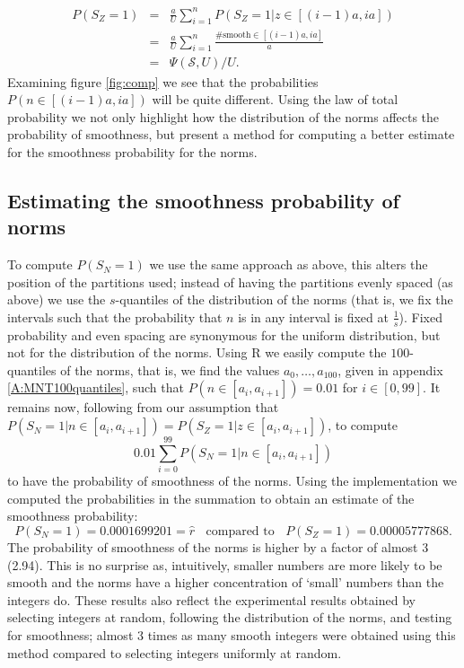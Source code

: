 \documentclass[a4paper, 12pt, envcountsect, runningheads]{llncs}
\numberwithin{figure}{section}
\numberwithin{equation}{section}
\begin{document}
\begin{eqnarray*}
P(S_Z=1)&=&\frac{a}{U}\sum_{i=1}^{n}P(S_Z=1| z\in[(i-1)a,ia])\\
&=&\frac{a}{U}\sum_{i=1}^{n}\frac{\#\mbox{smooth}\in[(i-1)a,ia]}{a}\\
&=&\Psi(\mathcal{S},U)/U.
\end{eqnarray*}
Examining figure \ref{fig:comp} we see that the probabilities $P(n\in[(i-1)a,ia])$ will be quite different. Using the law of total probability we not only highlight how the distribution of the norms affects the probability of smoothness, but present a method for computing a better estimate for the smoothness probability for the norms. 

\subsection{Estimating the smoothness probability of norms}
\label{ss:smoothness}
To compute $P(S_N=1)$ we use the same approach as above, this alters the position of the partitions used; instead of having the partitions evenly spaced (as above) we use the $s$-quantiles of the distribution of the norms (that is, we fix the intervals such that the probability that $n$ is in any interval is fixed at $\frac{1}{s}$). Fixed probability and even spacing are synonymous for the uniform distribution, but not for the distribution of the norms. Using R we easily compute the $100$-quantiles of the norms, that is, we find the values $a_0,\ldots,a_{100}$, given in appendix \ref{A:MNT100quantiles}, such that $P(n\in[a_i,a_{i+1}])=0.01$ for $i\in[0,99]$. It remains now, following from our assumption that $P(S_N=1| n\in[a_i,a_{i+1}])=P(S_Z=1| z\in[a_i,a_{i+1}])$, to compute $$0.01\sum_{i=0}^{99}P(S_N=1| n\in[a_i,a_{i+1}])$$ to have the probability of smoothness of the norms. Using the implementation \cite{dan_imp} we computed the probabilities in the summation to obtain an estimate of the smoothness probability: $$P(S_N=1)=0.0001699201=\hat{r}\;\;\mbox{ compared to }\;\;P(S_Z=1)=0.00005777868.$$
The probability of smoothness of the norms is higher by a factor of almost 3 (2.94). This is no surprise as, intuitively, smaller numbers are more likely to be smooth and the norms have a higher concentration of `small' numbers than the integers do. These results also reflect the experimental results obtained by selecting integers at random, following the distribution of the norms, and testing for smoothness; almost 3 times as many smooth integers were obtained using this method compared to selecting integers uniformly at random.
\end{document}
